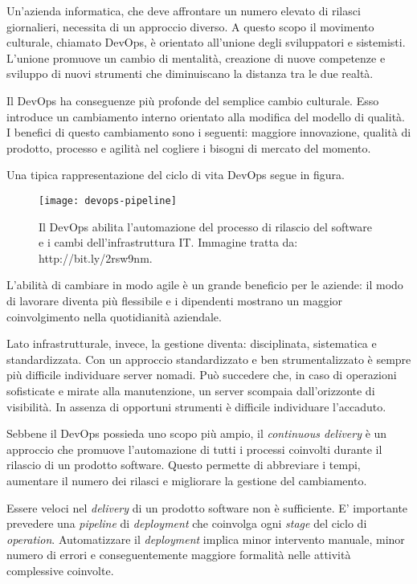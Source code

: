 Un'azienda informatica, che deve affrontare un numero elevato di rilasci 
giornalieri, 
necessita di un approccio diverso. A questo scopo il movimento culturale, 
chiamato DevOps, è orientato all'unione degli sviluppatori e sistemisti. 
L'unione promuove un cambio di mentalità, creazione di nuove competenze e 
sviluppo di nuovi strumenti che diminuiscano la distanza tra le due realtà. 

Il DevOps ha conseguenze più profonde del semplice cambio culturale.  
Esso introduce un cambiamento interno orientato alla modifica del modello 
di qualità. I benefici di questo cambiamento sono i seguenti: maggiore 
innovazione, qualità di prodotto, processo e agilità nel cogliere i bisogni di 
mercato del momento.

Una tipica rappresentazione del ciclo di vita DevOps segue in figura. 

\begin{figure}[htbp]
	\begin{center}
		\texttt{[image: devops-pipeline]}
		\caption{Il DevOps abilita l'automazione del processo di 
rilascio del software e i cambi dell'infrastruttura IT. Immagine tratta da: 
http://bit.ly/2rsw9nm.}
	\end{center}
\end{figure}

L'abilità di cambiare in modo agile è un grande beneficio per le aziende: il 
modo di lavorare diventa più flessibile e i dipendenti mostrano un maggior 
coinvolgimento nella quotidianità aziendale.    

Lato infrastrutturale, invece, la gestione diventa: disciplinata, sistematica e 
standardizzata. Con un approccio standardizzato e ben strumentalizzato è sempre 
più difficile individuare server nomadi. Può succedere che, in caso di 
operazioni sofisticate e mirate alla manutenzione, un server scompaia 
dall'orizzonte di visibilità. In assenza di opportuni strumenti è difficile 
individuare l'accaduto.   

Sebbene il DevOps possieda uno scopo più ampio, il \textit{continuous delivery} 
è un approccio che promuove l'automazione di tutti i processi coinvolti 
durante il rilascio di un prodotto software. Questo permette di abbreviare i 
tempi, aumentare il numero dei rilasci e migliorare la gestione del cambiamento.

Essere veloci nel \textit{delivery} di un prodotto software non è sufficiente. 
E' importante prevedere una \textit{pipeline} di \textit{deployment} che 
coinvolga ogni \textit{stage} del ciclo di \textit{operation}. Automatizzare il 
\textit{deployment} implica minor intervento manuale, minor numero di errori e 
conseguentemente maggiore formalità nelle attività complessive coinvolte. 

